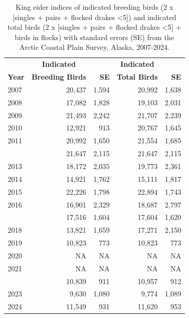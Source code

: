 \documentclass[
]{article}
\begin{document}
\begingroup\fontsize{10}{12}\selectfont

\begin{longtable}[t]{lrrrr}

\caption{\label{tbl-KIEI}King eider indices of indicated breeding birds
(2 x {[}singles + pairs + flocked drakes \textless5{]}) and indicated
total birds (2 x {[}singles + pairs + flocked drakes \textless5{]} +
birds in flocks) with standard errors (SE) from the Arctic Coastal Plain
Survey, Alaska, 2007-2024.}

\tabularnewline

\\
\toprule
\multicolumn{1}{c}{\textbf{ }} & \multicolumn{1}{c}{\textbf{Indicated}} & \multicolumn{1}{c}{\textbf{ }} & \multicolumn{1}{c}{\textbf{Indicated}} & \multicolumn{1}{c}{\textbf{ }} \\
\cmidrule(l{3pt}r{3pt}){2-2} \cmidrule(l{3pt}r{3pt}){4-4}
\textbf{Year} & \textbf{Breeding Birds} & \textbf{SE} & \textbf{Total Birds} & \textbf{SE}\\
\midrule
2007 & 20,437 & 1,594 & 20,992 & 1,638\\
2008 & 17,082 & 1,828 & 19,103 & 2,031\\
2009 & 21,493 & 2,242 & 21,707 & 2,239\\
2010 & 12,921 & 913 & 20,767 & 1,645\\
2011 & 20,992 & 1,650 & 21,554 & 1,685\\
\addlinespace
2012 & 21,647 & 2,115 & 21,647 & 2,115\\
2013 & 18,172 & 2,035 & 19,773 & 2,361\\
2014 & 14,921 & 1,762 & 15,111 & 1,817\\
2015 & 22,226 & 1,798 & 22,894 & 1,743\\
2016 & 16,901 & 2,329 & 18,687 & 2,797\\
\addlinespace
2017 & 17,516 & 1,604 & 17,604 & 1,620\\
2018 & 13,821 & 1,659 & 17,271 & 2,150\\
2019 & 10,823 & 773 & 10,823 & 773\\
2020 & NA & NA & NA & NA\\
2021 & NA & NA & NA & NA\\
\addlinespace
2022 & 10,839 & 911 & 10,957 & 912\\
2023 & 9,630 & 1,080 & 9,774 & 1,089\\
2024 & 11,549 & 931 & 11,620 & 953\\
\bottomrule

\end{longtable}
\end{document}
